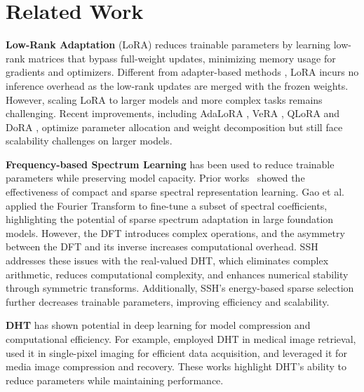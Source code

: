 \section{Related Work}
\noindent \textbf{Low-Rank Adaptation} (LoRA) \cite{hu2022lora} reduces trainable parameters by learning low-rank matrices that bypass full-weight updates, minimizing memory usage for gradients and optimizers. 
Different from adapter-based methods \cite{he2021towards, pfeiffer2020adapterfusion, lin2020exploring, liao2023make, liao2023parameter}, LoRA incurs no inference overhead as the low-rank updates are merged with the frozen weights. However, scaling LoRA to larger models and more complex tasks remains challenging.
Recent improvements, including AdaLoRA \cite{zhang2303adaptive}, VeRA \cite{kopiczko2023vera}, QLoRA \cite{dettmers2024qlora} and DoRA \cite{liu2024dora}, optimize parameter allocation and weight decomposition but still face scalability challenges on larger models. 


\noindent \textbf{Frequency-based Spectrum Learning} has been used to reduce trainable parameters while preserving model capacity. Prior works~\cite{xu2020learning,tang2022rethinking,yang2016exact} showed the effectiveness of compact and sparse spectral representation learning. Gao et al.~\cite{gao2024parameter} applied the Fourier Transform to fine-tune a subset of spectral coefficients, highlighting the potential of sparse spectrum adaptation in large foundation models. However, the DFT introduces complex operations, and the asymmetry between the DFT and its inverse increases computational overhead.
SSH addresses these issues with the real-valued DHT, which eliminates complex arithmetic, reduces computational complexity, and enhances numerical stability through symmetric transforms. Additionally, SSH’s energy-based sparse selection further decreases trainable parameters, improving efficiency and scalability.




\noindent \textbf{DHT} has shown potential in deep learning for model compression and computational efficiency. For example, \cite{rani2024content} employed DHT in medical image retrieval, \cite{ma2021high} used it in single-pixel imaging for efficient data acquisition, and \cite{coutinho2021low} leveraged it for media image compression and recovery. These works highlight DHT’s ability to reduce parameters while maintaining performance. 
